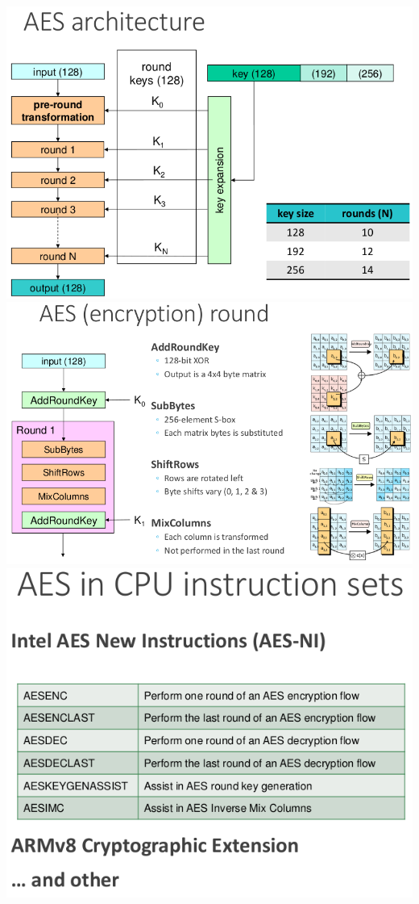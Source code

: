 \documentclass{article}
\begin{document}
\begin{center}
  \includegraphics[scale=0.3]{79}
  \includegraphics[scale=0.3]{80}
  \includegraphics[scale=0.3]{81}
\end{center}
\end{document}
